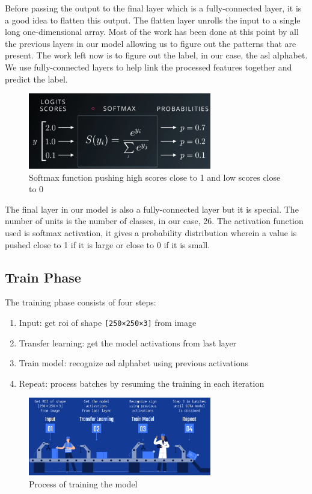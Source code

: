 \documentclass[twocolumn]{article}
\begin{document}
Before passing the output to the final layer which is a fully-connected layer, 
it is a good idea to flatten this output. The flatten layer unrolls the input 
to a single long one-dimensional array. Most of the work has been done at this 
point by all the previous layers in our model allowing us to figure out the 
patterns that are present. The work left now is to figure out the label, in 
our case, the \gls{asl} alphabet. We use fully-connected layers to help link 
the processed features together and predict the label.

\begin{figure}[h]
\centering
\includegraphics[width=8cm]{./figures/softmax function}
\caption{Softmax function pushing high scores close to 1 and low scores close to 0}
\end{figure}

The final layer in our model is also a fully-connected layer but it is 
special. The number of units is the number of classes, in our case, 26. The 
activation function used is softmax activation, it gives a probability 
distribution wherein a value is pushed close to 1 if it is large or close to 0 
if it is small.

\subsection{Train Phase}

The training phase consists of four steps:
\begin{enumerate}
	\item Input: get \gls{roi} of shape \texttt{[250×250×3]} from image
	\item Transfer learning: get the model activations from last layer
	\item Train model: recognize \gls{asl} alphabet using previous activations
	\item Repeat: process batches by resuming the training in each iteration
\end{enumerate}

\begin{figure}[h]
\centering
\includegraphics[width=8cm]{./figures/train process}
\caption{Process of training the model}
\end{figure}
\end{document}
